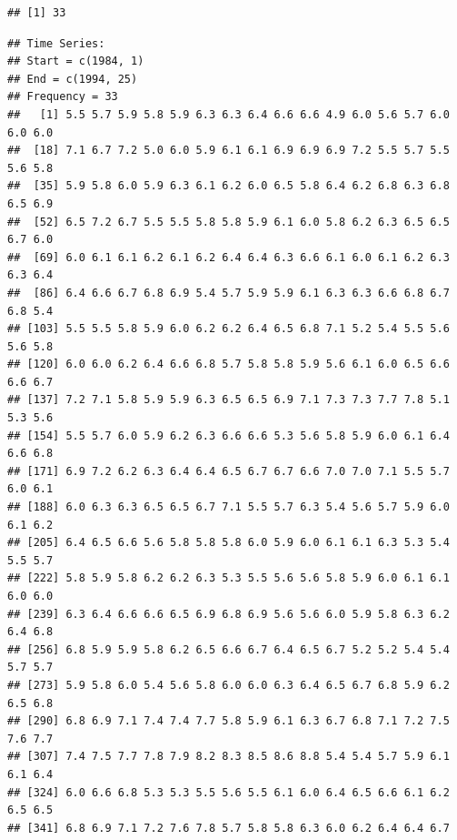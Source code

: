 \documentclass[12pt,]{article}
\newenvironment{Shaded}{\begin{snugshade}}{\end{snugshade}}
\newcommand{\KeywordTok}[1]{\textcolor[rgb]{0.13,0.29,0.53}{\textbf{#1}}}
\newcommand{\DataTypeTok}[1]{\textcolor[rgb]{0.13,0.29,0.53}{#1}}
\newcommand{\DecValTok}[1]{\textcolor[rgb]{0.00,0.00,0.81}{#1}}
\newcommand{\StringTok}[1]{\textcolor[rgb]{0.31,0.60,0.02}{#1}}
\newcommand{\CommentTok}[1]{\textcolor[rgb]{0.56,0.35,0.01}{\textit{#1}}}
\newcommand{\OperatorTok}[1]{\textcolor[rgb]{0.81,0.36,0.00}{\textbf{#1}}}
\newcommand{\NormalTok}[1]{#1}
\begin{document}
\begin{Shaded}
\end{Shaded}

\begin{verbatim}
## [1] 33
\end{verbatim}

\begin{Shaded}
\end{Shaded}

\begin{verbatim}
## Time Series:
## Start = c(1984, 1) 
## End = c(1994, 25) 
## Frequency = 33 
##   [1] 5.5 5.7 5.9 5.8 5.9 6.3 6.3 6.4 6.6 6.6 4.9 6.0 5.6 5.7 6.0 6.0 6.0
##  [18] 7.1 6.7 7.2 5.0 6.0 5.9 6.1 6.1 6.9 6.9 6.9 7.2 5.5 5.7 5.5 5.6 5.8
##  [35] 5.9 5.8 6.0 5.9 6.3 6.1 6.2 6.0 6.5 5.8 6.4 6.2 6.8 6.3 6.8 6.5 6.9
##  [52] 6.5 7.2 6.7 5.5 5.5 5.8 5.8 5.9 6.1 6.0 5.8 6.2 6.3 6.5 6.5 6.7 6.0
##  [69] 6.0 6.1 6.1 6.2 6.1 6.2 6.4 6.4 6.3 6.6 6.1 6.0 6.1 6.2 6.3 6.3 6.4
##  [86] 6.4 6.6 6.7 6.8 6.9 5.4 5.7 5.9 5.9 6.1 6.3 6.3 6.6 6.8 6.7 6.8 5.4
## [103] 5.5 5.5 5.8 5.9 6.0 6.2 6.2 6.4 6.5 6.8 7.1 5.2 5.4 5.5 5.6 5.6 5.8
## [120] 6.0 6.0 6.2 6.4 6.6 6.8 5.7 5.8 5.8 5.9 5.6 6.1 6.0 6.5 6.6 6.6 6.7
## [137] 7.2 7.1 5.8 5.9 5.9 6.3 6.5 6.5 6.9 7.1 7.3 7.3 7.7 7.8 5.1 5.3 5.6
## [154] 5.5 5.7 6.0 5.9 6.2 6.3 6.6 6.6 5.3 5.6 5.8 5.9 6.0 6.1 6.4 6.6 6.8
## [171] 6.9 7.2 6.2 6.3 6.4 6.4 6.5 6.7 6.7 6.6 7.0 7.0 7.1 5.5 5.7 6.0 6.1
## [188] 6.0 6.3 6.3 6.5 6.5 6.7 7.1 5.5 5.7 6.3 5.4 5.6 5.7 5.9 6.0 6.1 6.2
## [205] 6.4 6.5 6.6 5.6 5.8 5.8 5.8 6.0 5.9 6.0 6.1 6.1 6.3 5.3 5.4 5.5 5.7
## [222] 5.8 5.9 5.8 6.2 6.2 6.3 5.3 5.5 5.6 5.6 5.8 5.9 6.0 6.1 6.1 6.0 6.0
## [239] 6.3 6.4 6.6 6.6 6.5 6.9 6.8 6.9 5.6 5.6 6.0 5.9 5.8 6.3 6.2 6.4 6.8
## [256] 6.8 5.9 5.9 5.8 6.2 6.5 6.6 6.7 6.4 6.5 6.7 5.2 5.2 5.4 5.4 5.7 5.7
## [273] 5.9 5.8 6.0 5.4 5.6 5.8 6.0 6.0 6.3 6.4 6.5 6.7 6.8 5.9 6.2 6.5 6.8
## [290] 6.8 6.9 7.1 7.4 7.4 7.7 5.8 5.9 6.1 6.3 6.7 6.8 7.1 7.2 7.5 7.6 7.7
## [307] 7.4 7.5 7.7 7.8 7.9 8.2 8.3 8.5 8.6 8.8 5.4 5.4 5.7 5.9 6.1 6.1 6.4
## [324] 6.0 6.6 6.8 5.3 5.3 5.5 5.6 5.5 6.1 6.0 6.4 6.5 6.6 6.1 6.2 6.5 6.5
## [341] 6.8 6.9 7.1 7.2 7.6 7.8 5.7 5.8 5.8 6.3 6.0 6.2 6.4 6.4 6.7
\end{verbatim}
\end{document}
